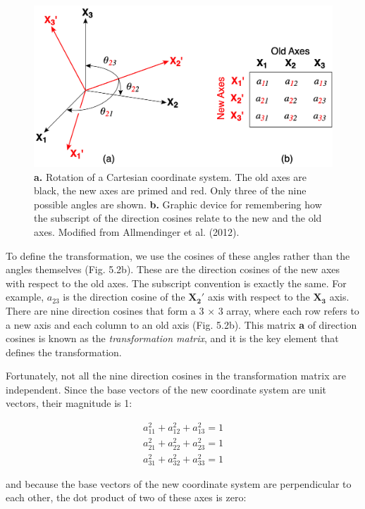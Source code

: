 \documentclass[a4paper , 12pt]{book}
\begin{document}
 \begin{figure}[H]
    \centering
    \includegraphics[width=12cm]{Figures/ch5f2.png}
    \caption{\textbf{a.} Rotation of a Cartesian coordinate system. The old axes are black, the new axes are primed and red. Only three of the nine possible angles are shown. \textbf{b.} Graphic device for remembering how the subscript of the direction cosines relate to the new and the old axes. Modified from Allmendinger et al. (2012).}
\end{figure}

To define the transformation, we use the cosines of these angles rather than the angles themselves (Fig. 5.2b). These are the direction cosines of the new axes with respect to the old axes. The subscript convention is exactly the same. For example, $a_{23}$ is the direction cosine of the $\mathbf{X_2\text{$'$}}$ axis with respect to the $\mathbf{X_3}$ axis. There are nine direction cosines that form a 3 $\times$ 3 array, where each row refers to a new axis and each column to an old axis (Fig. 5.2b). This matrix \textbf{a} of direction cosines is known as the \textit{transformation matrix}, and it is the key element that defines the transformation.

Fortunately, not all the nine direction cosines in the transformation matrix are independent. Since the base vectors of the new coordinate system are unit vectors, their magnitude is 1:

\begin{equation}
    \begin{split}
        a_{11}^2+a_{12}^2+a_{13}^2=1 \\
        a_{21}^2+a_{22}^2+a_{23}^2=1 \\
        a_{31}^2+a_{32}^2+a_{33}^2=1
    \end{split}
\end{equation}

and because the base vectors of the new coordinate system are perpendicular to each other, the dot product of two of these axes is zero:
\end{document}
